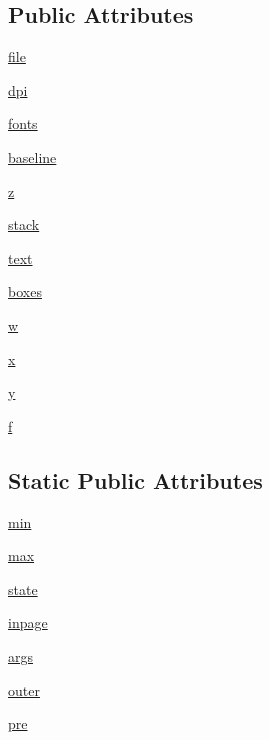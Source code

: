 \subsection*{Public Attributes}
\begin{DoxyCompactItemize}
\item 
\hyperlink{classmatplotlib_1_1dviread_1_1Dvi_aa9559a88edd1f9ca0403477c2b15f069}{file}
\item 
\hyperlink{classmatplotlib_1_1dviread_1_1Dvi_a4780c17da3c32da700aa7858d29562f6}{dpi}
\item 
\hyperlink{classmatplotlib_1_1dviread_1_1Dvi_ac67d2645243a24bbb7f34c832df0785c}{fonts}
\item 
\hyperlink{classmatplotlib_1_1dviread_1_1Dvi_ac0f8c5d5c2bda108ee0b4f9d54adf88b}{baseline}
\item 
\hyperlink{classmatplotlib_1_1dviread_1_1Dvi_a293a84f008cf738af2ac75ede5e96893}{z}
\item 
\hyperlink{classmatplotlib_1_1dviread_1_1Dvi_adb3cda4e367883f713bdbaac3a5fc08e}{stack}
\item 
\hyperlink{classmatplotlib_1_1dviread_1_1Dvi_a40834bfbb8f255f51925f9f50d141150}{text}
\item 
\hyperlink{classmatplotlib_1_1dviread_1_1Dvi_a0db76c0c8a56d6dc743308c3687a6565}{boxes}
\item 
\hyperlink{classmatplotlib_1_1dviread_1_1Dvi_aca4d5c297a37eb8390125a599f0da6c6}{w}
\item 
\hyperlink{classmatplotlib_1_1dviread_1_1Dvi_a785a2f22c28527b55865450e33857b88}{x}
\item 
\hyperlink{classmatplotlib_1_1dviread_1_1Dvi_a897b9041ab58796a8fb89e62b3667d38}{y}
\item 
\hyperlink{classmatplotlib_1_1dviread_1_1Dvi_a5d15875c6457044db341a78f8380310f}{f}
\end{DoxyCompactItemize}
\subsection*{Static Public Attributes}
\begin{DoxyCompactItemize}
\item 
\hyperlink{classmatplotlib_1_1dviread_1_1Dvi_ae7370d0534bafc35a7759d0fbf7e471f}{min}
\item 
\hyperlink{classmatplotlib_1_1dviread_1_1Dvi_a61e8b8b02ec7553241c0fe42c9555004}{max}
\item 
\hyperlink{classmatplotlib_1_1dviread_1_1Dvi_a87ef35c6e9fb51513b57a8720a1410c4}{state}
\item 
\hyperlink{classmatplotlib_1_1dviread_1_1Dvi_a90b7fab9eb7fc96defa6ba70456e61a1}{inpage}
\item 
\hyperlink{classmatplotlib_1_1dviread_1_1Dvi_abe12ec8b95487997b9423a4eaf714399}{args}
\item 
\hyperlink{classmatplotlib_1_1dviread_1_1Dvi_a68655b697587660183445bf0b901014c}{outer}
\item 
\hyperlink{classmatplotlib_1_1dviread_1_1Dvi_a878b883e6f20468280062fbe42331869}{pre}
\end{DoxyCompactItemize}


